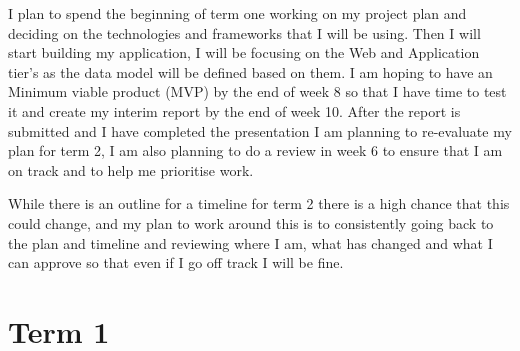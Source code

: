 \documentclass[]{project_report}
\begin{document}
I plan to spend the beginning of term one working on my project plan and deciding on the technologies and frameworks that I will be using. Then I will start building my application, I will be focusing on the Web and Application tier's as the data model will be defined based on them. I am hoping to have an Minimum viable product (MVP) by the end of week 8 so that I have time to test it and create my interim report by the end of week 10. After the report is submitted and I have completed the presentation I am planning to re-evaluate my plan for term 2, I am also planning to do a review in week 6 to ensure that I am on track and to help me prioritise work. \newline

While there is an outline for a timeline for term 2 there is a high chance that this could change, and my plan to work around this is to consistently going back to the plan and timeline and reviewing where I am, what has changed and what I can approve so that even if I go off track I will be fine.


\section{Term 1}
\end{document}
